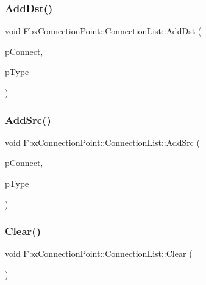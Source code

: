 \subsubsection{\texorpdfstring{Add\+Dst()}{AddDst()}}
{\footnotesize\ttfamily void Fbx\+Connection\+Point\+::\+Connection\+List\+::\+Add\+Dst (\begin{DoxyParamCaption}\item[{\hyperlink{class_fbx_connection_point}{Fbx\+Connection\+Point} $\ast$}]{p\+Connect,  }\item[{\hyperlink{class_fbx_connection_a3df448a5db356652ab99fd2be2553749}{Fbx\+Connection\+::\+E\+Type}}]{p\+Type }\end{DoxyParamCaption})}

\mbox{\label{class_fbx_connection_point_1_1_connection_list_a140699ae7b2ea49f2bac26557f2ac840}} 
\subsubsection{\texorpdfstring{Add\+Src()}{AddSrc()}}
{\footnotesize\ttfamily void Fbx\+Connection\+Point\+::\+Connection\+List\+::\+Add\+Src (\begin{DoxyParamCaption}\item[{\hyperlink{class_fbx_connection_point}{Fbx\+Connection\+Point} $\ast$}]{p\+Connect,  }\item[{\hyperlink{class_fbx_connection_a3df448a5db356652ab99fd2be2553749}{Fbx\+Connection\+::\+E\+Type}}]{p\+Type }\end{DoxyParamCaption})}

\mbox{\label{class_fbx_connection_point_1_1_connection_list_a3342409b306106433c9146575ae6f101}} 
\subsubsection{\texorpdfstring{Clear()}{Clear()}}
{\footnotesize\ttfamily void Fbx\+Connection\+Point\+::\+Connection\+List\+::\+Clear (\begin{DoxyParamCaption}{ }\end{DoxyParamCaption})}

